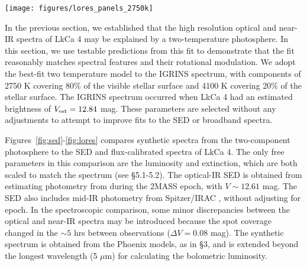 \documentclass[twocolumn]{emulateapj}%
\begin{document}
\begin{figure*}
 \centering
 \texttt{[image: figures/lores\_panels\_2750k]}
 \caption{Top:  The low-resolution optical/near-IR spectrum of LkCa 4 obtained from Palomar/DBSP and APO/Triplespec on 30 December 2008 (black), compared to a synthetic spectrum of a two temperature photosphere (purple).  The inset shows that the 2750 K (red, 70\% fill factor) and 4100 K (blue, 30\% fill factor) components contribute equally to the near-IR spectrum, but the 4100 K component dominates the blue emission.  The synthetic spectrum is reddened by $A_V=0.4$ mag and scaled to the observed $J$-band spectrum. Bottom:  The low-resolution optical (left) and near-IR (right) spectrum of LkCa 4, compared with a 3900 K photosphere (blue), a 3500 K photosphere, and the two temperature photosphere that best fit the IGRINS spectrum.  The synthetic spectra are scaled separately to the optical spectrum at 0.75 $\mu$m and to the near-IR spectrum at 1.5 $\mu$m.  Warm photospheres accurately reproduce molecular bands at $0.7$ $\mu$m but fail to fit the spectral features at longer wavelengths.  Cooler photospheres predict molecular bands at $<0.7$ $\mu$m that are much deeper than observed.  The two temperature photosphere accurately fits spectral features in the optical and near-IR.}
 \label{fig:lores}
\end{figure*}



In the previous section, we established that the high resolution optical and near-IR spectra of LkCa 4 may be explained by a two-temperature photosphere.  In this section, we use testable predictions from this fit to demonstrate that the fit reasonably matches spectral features and their rotational modulation.  We adopt the best-fit two temperature model to the IGRINS spectrum, with components of 2750 K covering 80\% of the visible stellar surface and 4100 K covering 20\% of the stellar surface.  The IGRINS spectrum occurred when LkCa 4 had an estimated brightness of $V_{\rm est}=12.84$ mag.  These parameters are selected without any adjustments to attempt to improve fits to the SED or broadband spectra.

Figures~\ref{fig:sed}-\ref{fig:lores} compares synthetic spectra from the two-component photosphere to the SED and flux-calibrated spectra of LkCa 4.  The only free parameters in this comparison are the luminosity and extinction, which are both scaled to match the spectrum (see \S 5.1-5.2).  The optical-IR SED is obtained from estimating photometry from \citet{grankin08} during the 2MASS epoch, with $V\sim12.61$ mag.  The SED also includes mid-IR photometry from Spitzer/IRAC \citep{hartmann05}, without adjusting for epoch.  In the spectroscopic comparison, some minor discrepancies between the optical and near-IR spectra may be introduced because the spot coverage changed in the $\sim 5$ hrs between observations ($\Delta V=0.08$ mag).  The synthetic spectrum is obtained from the Phoenix models, as in \S 3, and is extended beyond the longest wavelength (5 $\mu$m) for calculating the bolometric luminosity.
\end{document}
